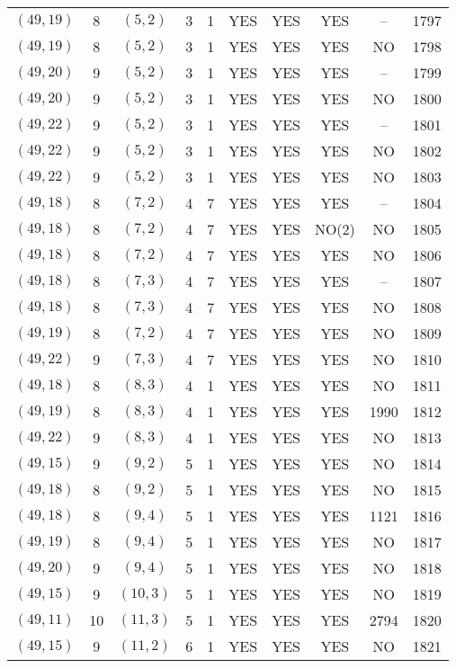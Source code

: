 \begin{longtable}{|c|c|c|c|c|c|c|c|c|c|}
$(49, 19)$ & 8 & $(5, 2)$ & 3 & 1 & YES & YES & YES & -- & 1797\\
$(49, 19)$ & 8 & $(5, 2)$ & 3 & 1 & YES & YES & YES & NO & 1798\\
$(49, 20)$ & 9 & $(5, 2)$ & 3 & 1 & YES & YES & YES & -- & 1799\\
$(49, 20)$ & 9 & $(5, 2)$ & 3 & 1 & YES & YES & YES & NO & 1800\\
$(49, 22)$ & 9 & $(5, 2)$ & 3 & 1 & YES & YES & YES & -- & 1801\\
$(49, 22)$ & 9 & $(5, 2)$ & 3 & 1 & YES & YES & YES & NO & 1802\\
$(49, 22)$ & 9 & $(5, 2)$ & 3 & 1 & YES & YES & YES & NO & 1803\\
$(49, 18)$ & 8 & $(7, 2)$ & 4 & 7 & YES & YES & YES & -- & 1804\\
$(49, 18)$ & 8 & $(7, 2)$ & 4 & 7 & YES & YES & NO(2) & NO & 1805\\
$(49, 18)$ & 8 & $(7, 2)$ & 4 & 7 & YES & YES & YES & NO & 1806\\
$(49, 18)$ & 8 & $(7, 3)$ & 4 & 7 & YES & YES & YES & -- & 1807\\
$(49, 18)$ & 8 & $(7, 3)$ & 4 & 7 & YES & YES & YES & NO & 1808\\
$(49, 19)$ & 8 & $(7, 2)$ & 4 & 7 & YES & YES & YES & NO & 1809\\
$(49, 22)$ & 9 & $(7, 3)$ & 4 & 7 & YES & YES & YES & NO & 1810\\
$(49, 18)$ & 8 & $(8, 3)$ & 4 & 1 & YES & YES & YES & NO & 1811\\
$(49, 19)$ & 8 & $(8, 3)$ & 4 & 1 & YES & YES & YES & 1990 & 1812\\
$(49, 22)$ & 9 & $(8, 3)$ & 4 & 1 & YES & YES & YES & NO & 1813\\
$(49, 15)$ & 9 & $(9, 2)$ & 5 & 1 & YES & YES & YES & NO & 1814\\
$(49, 18)$ & 8 & $(9, 2)$ & 5 & 1 & YES & YES & YES & NO & 1815\\
$(49, 18)$ & 8 & $(9, 4)$ & 5 & 1 & YES & YES & YES & 1121 & 1816\\
$(49, 19)$ & 8 & $(9, 4)$ & 5 & 1 & YES & YES & YES & NO & 1817\\
$(49, 20)$ & 9 & $(9, 4)$ & 5 & 1 & YES & YES & YES & NO & 1818\\
$(49, 15)$ & 9 & $(10, 3)$ & 5 & 1 & YES & YES & YES & NO & 1819\\
$(49, 11)$ & 10 & $(11, 3)$ & 5 & 1 & YES & YES & YES & 2794 & 1820\\
$(49, 15)$ & 9 & $(11, 2)$ & 6 & 1 & YES & YES & YES & NO & 1821\\

\end{longtable}
